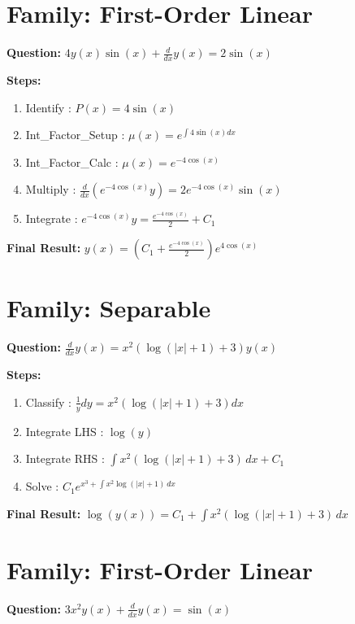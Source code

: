 \documentclass{article}
\begin{document}
\section*{Family: First-Order Linear}
\textbf{Question:} $4 y{\left(x \right)} \sin{\left(x \right)} + \frac{d}{d x} y{\left(x \right)} = 2 \sin{\left(x \right)}$

\textbf{Steps:}
\begin{enumerate}
\item Identify :  $P(x) = 4 \sin{\left(x \right)}$
\item Int_Factor_Setup :  $\mu(x) = e^{\int 4 \sin{\left(x \right)} dx}$
\item Int_Factor_Calc :  $\mu(x) = e^{- 4 \cos{\left(x \right)}}$
\item Multiply :  $\frac{d}{dx}(e^{- 4 \cos{\left(x \right)}}y) = 2 e^{- 4 \cos{\left(x \right)}} \sin{\left(x \right)}$
\item Integrate :  $e^{- 4 \cos{\left(x \right)}}y = \frac{e^{- 4 \cos{\left(x \right)}}}{2} + C_1$
\end{enumerate}
\textbf{Final Result:} $y{\left(x \right)} = \left(C_{1} + \frac{e^{- 4 \cos{\left(x \right)}}}{2}\right) e^{4 \cos{\left(x \right)}}$

\section*{Family: Separable}
\textbf{Question:} $\frac{d}{d x} y{\left(x \right)} = x^{2} \left(\log{\left(\left|{x}\right| + 1 \right)} + 3\right) y{\left(x \right)}$

\textbf{Steps:}
\begin{enumerate}
\item Classify :  $\frac{1}{y} dy = x^{2} \left(\log{\left(\left|{x}\right| + 1 \right)} + 3\right) dx$
\item Integrate LHS :  $\log{\left(y \right)}$
\item Integrate RHS :  $\int x^{2} \left(\log{\left(\left|{x}\right| + 1 \right)} + 3\right)\, dx + C_1$
\item Solve :  $C_{1} e^{x^{3} + \int x^{2} \log{\left(\left|{x}\right| + 1 \right)}\, dx}$
\end{enumerate}
\textbf{Final Result:} $\log{\left(y{\left(x \right)} \right)} = C_{1} + \int x^{2} \left(\log{\left(\left|{x}\right| + 1 \right)} + 3\right)\, dx$

\section*{Family: First-Order Linear}
\textbf{Question:} $3 x^{2} y{\left(x \right)} + \frac{d}{d x} y{\left(x \right)} = \sin{\left(x \right)}$
\end{document}
